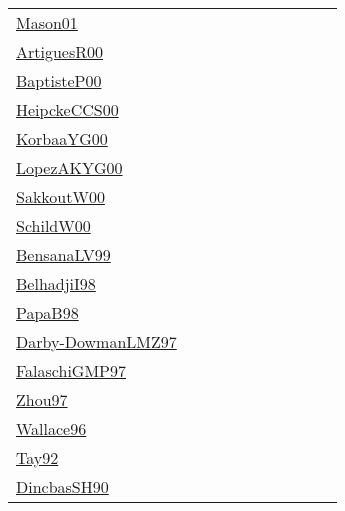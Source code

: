 {\begin{longtable}{p{3cm}p{4cm}p{2cm}p{2cm}p{2cm}p{2cm}p{2cm}p{2cm}p{2cm}p{2cm}}
\href{articles/Mason01.pdf}{Mason01}~\cite{Mason01} &  &  &  &  &  &  &  &  & \\
\href{articles/ArtiguesR00.pdf}{ArtiguesR00}~\cite{ArtiguesR00} &  &  &  &  &  &  &  &  & \\
\href{articles/BaptisteP00.pdf}{BaptisteP00}~\cite{BaptisteP00} &  &  &  &  &  &  &  &  & \\
\href{articles/HeipckeCCS00.pdf}{HeipckeCCS00}~\cite{HeipckeCCS00} &  &  &  &  &  &  &  &  & \\
\href{articles/KorbaaYG00.pdf}{KorbaaYG00}~\cite{KorbaaYG00} &  &  &  &  &  &  &  &  & \\
\href{articles/LopezAKYG00.pdf}{LopezAKYG00}~\cite{LopezAKYG00} &  &  &  &  &  &  &  &  & \\
\href{articles/SakkoutW00.pdf}{SakkoutW00}~\cite{SakkoutW00} &  &  &  &  &  &  &  &  & \\
\href{articles/SchildW00.pdf}{SchildW00}~\cite{SchildW00} &  &  &  &  &  &  &  &  & \\
\href{articles/BensanaLV99.pdf}{BensanaLV99}~\cite{BensanaLV99} &  &  &  &  &  &  &  &  & \\
\href{articles/BelhadjiI98.pdf}{BelhadjiI98}~\cite{BelhadjiI98} &  &  &  &  &  &  &  &  & \\
\href{articles/PapaB98.pdf}{PapaB98}~\cite{PapaB98} &  &  &  &  &  &  &  &  & \\
\href{articles/Darby-DowmanLMZ97.pdf}{Darby-DowmanLMZ97}~\cite{Darby-DowmanLMZ97} &  &  &  &  &  &  &  &  & \\
\href{articles/FalaschiGMP97.pdf}{FalaschiGMP97}~\cite{FalaschiGMP97} &  &  &  &  &  &  &  &  & \\
\href{articles/Zhou97.pdf}{Zhou97}~\cite{Zhou97} &  &  &  &  &  &  &  &  & \\
\href{articles/Wallace96.pdf}{Wallace96}~\cite{Wallace96} &  &  &  &  &  &  &  &  & \\
\href{}{Tay92}~\cite{Tay92} &  &  &  &  &  &  &  &  & \\
\href{articles/DincbasSH90.pdf}{DincbasSH90}~\cite{DincbasSH90} &  &  &  &  &  &  &  &  & \\
\end{longtable}
}

